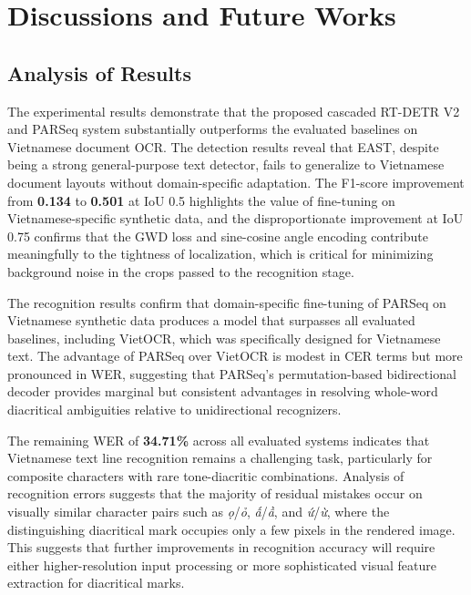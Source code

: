 \section{Discussions and Future Works}
\subsection{Analysis of Results}

The experimental results demonstrate that the proposed cascaded RT-DETR V2 and PARSeq system substantially outperforms the evaluated baselines on Vietnamese document OCR. The detection results reveal that EAST, despite being a strong general-purpose text detector, fails to generalize to Vietnamese document layouts without domain-specific adaptation. The F1-score improvement from \textbf{0.134} to \textbf{0.501} at IoU 0.5 highlights the value of fine-tuning on Vietnamese-specific synthetic data, and the disproportionate improvement at IoU 0.75 confirms that the GWD loss and sine-cosine angle encoding contribute meaningfully to the tightness of localization, which is critical for minimizing background noise in the crops passed to the recognition stage.

The recognition results confirm that domain-specific fine-tuning of PARSeq on Vietnamese synthetic data produces a model that surpasses all evaluated baselines, including VietOCR, which was specifically designed for Vietnamese text. The advantage of PARSeq over VietOCR is modest in CER terms but more pronounced in WER, suggesting that PARSeq's permutation-based bidirectional decoder provides marginal but consistent advantages in resolving whole-word diacritical ambiguities relative to unidirectional recognizers.

The remaining WER of \textbf{34.71\%} across all evaluated systems indicates that Vietnamese text line recognition remains a challenging task, particularly for composite characters with rare tone-diacritic combinations. Analysis of recognition errors suggests that the majority of residual mistakes occur on visually similar character pairs such as \textit{ọ}/\textit{ỏ}, \textit{ấ}/\textit{ầ}, and \textit{ứ}/\textit{ừ}, where the distinguishing diacritical mark occupies only a few pixels in the rendered image. This suggests that further improvements in recognition accuracy will require either higher-resolution input processing or more sophisticated visual feature extraction for diacritical marks.


